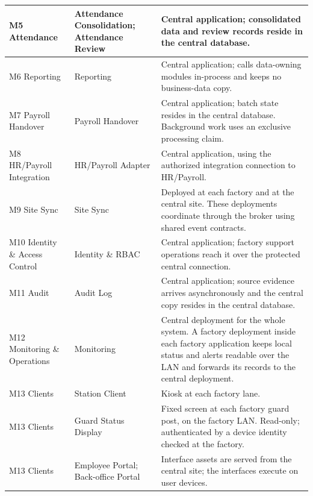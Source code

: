 \begin{longtable}{|>{\raggedright\arraybackslash}p{78.5pt}|>{\raggedright\arraybackslash}p{145.5pt}|>{\raggedright\arraybackslash}p{187.5pt}|}
\hline
M5 Attendance & Attendance Consolidation; \newline Attendance Review & Central application; consolidated data and review records reside in the central database. \\
\hline
M6 Reporting & Reporting & Central application; calls data-owning modules in-process and keeps no business-data copy. \\
\hline
M7 Payroll \newline Handover & Payroll Handover & Central application; batch state resides in the central database. Background work uses an exclusive processing claim. \\
\hline
M8 HR/Payroll \newline Integration & HR/Payroll Adapter & Central application, using the \newline authorized integration connection to \newline HR/Payroll. \\
\hline
M9 Site Sync & Site Sync & Deployed at each factory and at the \newline central site. These deployments \newline coordinate through the broker using \newline shared event contracts. \\
\hline
M10 Identity \newline \& Access \newline Control & Identity \& RBAC & Central application; factory support operations reach it over the protected central connection. \\
\hline
M11 Audit & Audit Log & Central application; source evidence arrives asynchronously and the central copy resides in the central database. \\
\hline
M12 \newline Monitoring \& \newline Operations & Monitoring & Central deployment for the whole system. A factory deployment inside each factory application keeps local status and alerts readable over the LAN and forwards its records to the central deployment. \\
\hline
M13 Clients & Station Client & Kiosk at each factory lane. \\
\hline
M13 Clients & Guard Status Display & Fixed screen at each factory guard post, on the factory LAN. Read-only; authenticated by a device identity checked at the factory. \\*
\hline\noalign{\nobreak}
M13 Clients & Employee Portal; \newline Back-office Portal & Interface assets are served from the \newline central site; the interfaces execute \newline on user devices. \\
\hline
\end{longtable}


